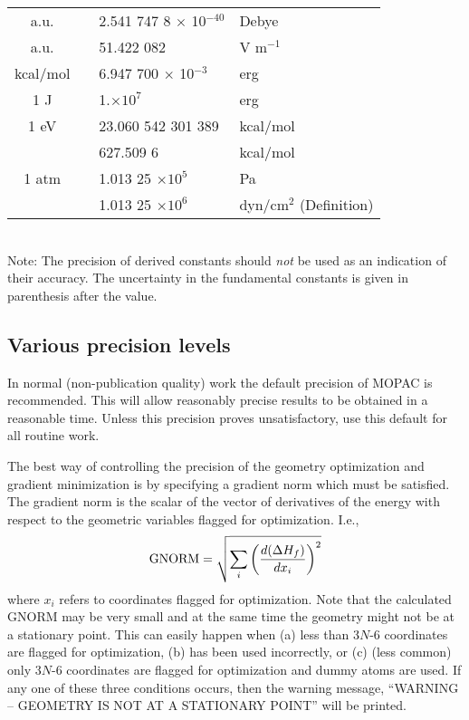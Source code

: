 \begin{table}
\begin{center}
\begin{tabular}{|ccll|}
a.u.      &  &  2.541 747 8 $\times$  10$^{-40}$ & Debye \\
a.u.        & & 51.422 082     & V m$^{-1}$\\
kcal/mol    & & 6.947 700 $\times$  10$^{-3}$ & erg\\
1 J &&1.$ \times 10^7$ & erg\\
1 eV &&23.060 542 301 389  &kcal/mol\\
&& 627.509 6& kcal/mol\\
1 atm && 1.013 25 $\times 10^5$ &Pa \\
&& 1.013 25 $\times 10^6$ &dyn/cm$^2$ (Definition)\\ \hline
\end{tabular}~\\
Note: The precision of derived constants should {\em not} be used as an
indication of their accuracy. The uncertainty in the fundamental constants is
given in parenthesis after the value. 
\end{center}
\end{table}


\subsection{Various precision levels}
In normal (non-publication quality) work the default  precision  of MOPAC  is
recommended.  This will allow reasonably precise results to be obtained  in  a 
reasonable  time.    Unless   this   precision   proves unsatisfactory, use
this default for all routine work.

The  best  way  of  controlling  the  precision  of  the   geometry
optimization  and gradient minimization is by specifying a gradient norm
 which must be satisfied.  The gradient norm is the scalar of
the vector of derivatives of the energy with respect to the geometric variables
flagged for optimization. I.e.,
$$
{\rm  GNORM}=\sqrt{\sum_i\left(\frac{d(\Delta H_f)}{dx_i}\right)^2}
$$
where $x_i$ refers to coordinates flagged for optimization.  Note that the
calculated GNORM may be very small and at the same time the geometry might not
be at a stationary point.  This can easily happen when (a) less than 3$N$-6
coordinates are flagged for optimization, (b)  has been used
incorrectly, or (c) (less common) only 3$N$-6 coordinates are flagged for
optimization and dummy atoms are used.  If any one of these three conditions
occurs, then the warning message,  ``WARNING -- GEOMETRY IS NOT AT A STATIONARY
POINT''   will be printed.

